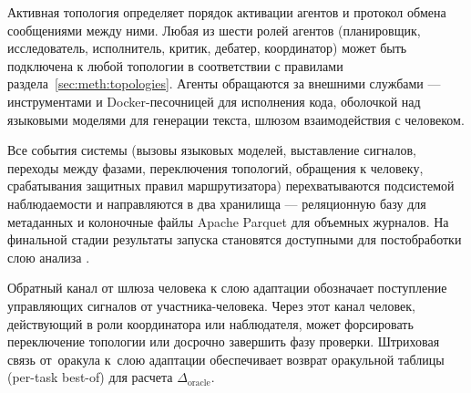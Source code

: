 Активная топология определяет порядок активации агентов и протокол
обмена сообщениями между ними. Любая из шести ролей агентов
(планировщик, исследователь, исполнитель, критик, дебатер,
координатор) может быть подключена к любой топологии в соответствии
с правилами раздела~\ref{sec:meth:topologies}. Агенты обращаются
за внешними службами --- инструментами и Docker-песочницей для
исполнения кода, оболочкой над языковыми моделями для генерации
текста, шлюзом взаимодействия с человеком.

Все события системы (вызовы языковых моделей, выставление сигналов,
переходы между фазами, переключения топологий, обращения к человеку,
срабатывания защитных правил маршрутизатора) перехватываются
подсистемой наблюдаемости и направляются в два хранилища ---
реляционную базу для метаданных и колоночные файлы Apache Parquet
для объемных журналов. На финальной стадии результаты запуска
становятся доступными для постобработки слою анализа
.

Обратный канал от шлюза человека к слою адаптации обозначает
поступление управляющих сигналов от участника-человека. Через
этот канал человек, действующий в роли координатора или наблюдателя,
может форсировать переключение топологии или досрочно завершить фазу
проверки. Штриховая связь от~оракула к~слою адаптации обеспечивает
возврат оракульной таблицы (per-task best-of) для расчета
$\Delta_{\text{oracle}}$.
